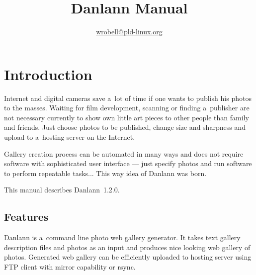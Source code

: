 \documentclass{article}
\title{Danlann Manual}
\author{\url{wrobell@pld-linux.org}}
\begin{document}
\maketitle

\tableofcontents
{}

\section{Introduction}
Internet and digital cameras save a~lot of time
if one wants to publish his photos to the masses. Waiting for film
development, scanning or finding a~publisher are not necessary currently to show
own little art pieces to other people than family and friends. Just choose
photos to be published, change size and sharpness and
upload to a~hosting server on the Internet.

Gallery creation process can be automated in many ways and does not require
software with sophisticated user interface --- just specify photos and run
software to perform repeatable tasks... This way idea of Danlann was born.

This manual describes Danlann~1.2.0.

\subsection{Features}
Danlann is a~command line photo web gallery generator.
It takes text gallery description files and photos as an input and produces 
nice looking web gallery of photos. Generated web gallery can be
efficiently uploaded to hosting server using FTP client with
mirror capability or rsync.
\end{document}
